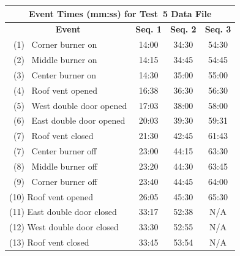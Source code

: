 \documentclass[12pt,oneside]{book}
\begin{document}
\begin{figure}[!ht]
\begin{minipage}[b]{0.8\columnwidth}
	\begin{flushleft}
	\small
	\begin{tabular}{lccc}
	\multicolumn{4}{c}{\normalsize Event Times (mm:ss) for Test~5 Data File} \\
	\toprule
	\multicolumn{1}{c}{\textbf{Event}} & \textbf{Seq. 1} & \textbf{Seq. 2} & \textbf{Seq. 3} \\
	\midrule
	~(1)~ Corner burner on 			& 	14:00		  &	   34:30		&	   54:30	\\
	~(2)~ Middle burner on 			&   14:15		  &	   34:45		&	   54:45	\\
	~(3)~ Center burner on 			&   14:30		  &	   35:00		&	   55:00	\\
	~(4)~ Roof vent opened 			&   16:38		  &    36:30		&	   56:30	\\
	~(5)~ West double door opened 	&	17:03		  &	   38:00 		&	   58:00 	\\
	~(6)~ East double door opened 	&   20:03		  &    39:30		&	   59:31	\\
	~(7)~ Roof vent closed		 	&   21:30		  &    42:45		&	   61:43	\\
	~(7)~ Center burner off 		&   23:00		  &    44:15		&	   63:30	\\
	~(8)~ Middle burner off 		&   23:20		  &    44:30		&	   63:45	\\
	~(9)~ Corner burner off 		&   23:40		  &    44:45		&	   64:00	\\
	(10) Roof vent opened			& 	26:05 		  &	   45:30		&	   65:30	\\
	(11) East double door closed	& 	33:17 		  &	   52:38		&	   N/A		\\
	(12) West double door closed	& 	33:30 		  &	   52:55		&	   N/A		\\
	(13) Roof vent closed		 	&   33:45		  &    53:54		&	   N/A		\\
	\bottomrule
	\end{tabular}
	\end{flushleft}
\end{minipage}
\begin{minipage}[b]{0.9\columnwidth}
	\vspace{15pt}
	\centering

\end{minipage}
\end{figure}
\end{document}
